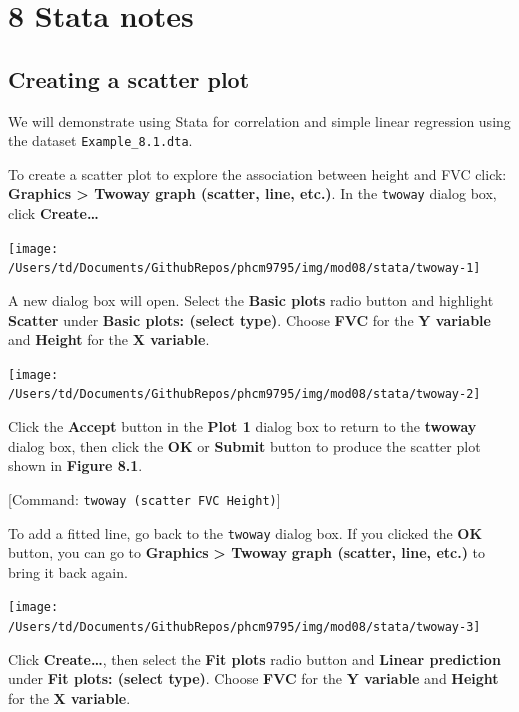 \documentclass[
]{memoir}
\begin{document}
\hypertarget{stata-notes-5}{%
\chapter*{\texorpdfstring{\textbf{8} Stata notes}{8 Stata notes}}\label{stata-notes-5}}

\hypertarget{creating-a-scatter-plot}{%
\section{Creating a scatter plot}\label{creating-a-scatter-plot}}

We will demonstrate using Stata for correlation and simple linear regression using the dataset \texttt{Example\_8.1.dta}.

To create a scatter plot to explore the association between height and FVC click: \textbf{Graphics \textgreater{} Twoway graph (scatter, line, etc.)}. In the \texttt{twoway} dialog box, click \textbf{Create\ldots{}}

\texttt{[image: /Users/td/Documents/GithubRepos/phcm9795/img/mod08/stata/twoway-1]}

A new dialog box will open. Select the \textbf{Basic plots} radio button and highlight \textbf{Scatter} under \textbf{Basic plots: (select type)}. Choose \textbf{FVC} for the \textbf{Y variable} and \textbf{Height} for the \textbf{X variable}.

\texttt{[image: /Users/td/Documents/GithubRepos/phcm9795/img/mod08/stata/twoway-2]}

Click the \textbf{Accept} button in the \textbf{Plot 1} dialog box to return to the \textbf{twoway} dialog box, then click the \textbf{OK} or \textbf{Submit} button to produce the scatter plot shown in \textbf{Figure 8.1}.

{[}Command: \texttt{twoway\ (scatter\ FVC\ Height)}{]}

To add a fitted line, go back to the \texttt{twoway} dialog box. If you clicked the \textbf{OK} button, you can go to \textbf{Graphics} \textbf{\textgreater{} Twoway} \textbf{graph (scatter, line, etc.)} to bring it back again.

\texttt{[image: /Users/td/Documents/GithubRepos/phcm9795/img/mod08/stata/twoway-3]}

Click \textbf{Create\ldots{}}, then select the \textbf{Fit plots} radio button and \textbf{Linear prediction} under \textbf{Fit plots: (select type)}. Choose \textbf{FVC} for the \textbf{Y variable} and \textbf{Height} for the \textbf{X variable}.
\end{document}
